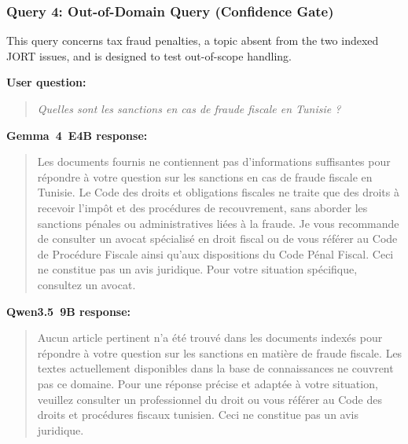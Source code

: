 \subsubsection{Query 4: Out-of-Domain Query (Confidence Gate)}
\label{subsubsec:ch4-query4}

This query concerns tax fraud penalties, a topic absent from the two indexed \ac{JORT} issues, and is designed to test out-of-scope handling.

\vspace{0.5em}

\noindent\textbf{User question:}

\begin{quote}
\textit{Quelles sont les sanctions en cas de fraude fiscale en Tunisie ?}
\end{quote}

\vspace{0.5em}

\noindent\textbf{Gemma~4~E4B response:}

\begin{quote}
Les documents fournis ne contiennent pas d'informations suffisantes pour répondre à votre question sur les sanctions en cas de fraude fiscale en Tunisie. Le Code des droits et obligations fiscales ne traite que des droits à recevoir l'impôt et des procédures de recouvrement, sans aborder les sanctions pénales ou administratives liées à la fraude. Je vous recommande de consulter un avocat spécialisé en droit fiscal ou de vous référer au Code de Procédure Fiscale ainsi qu'aux dispositions du Code Pénal Fiscal. Ceci ne constitue pas un avis juridique. Pour votre situation spécifique, consultez un avocat.
\end{quote}

\noindent\textbf{Qwen3.5~9B response:}

\begin{quote}
Aucun article pertinent n'a été trouvé dans les documents indexés pour répondre à votre question sur les sanctions en matière de fraude fiscale. Les textes actuellement disponibles dans la base de connaissances ne couvrent pas ce domaine. Pour une réponse précise et adaptée à votre situation, veuillez consulter un professionnel du droit ou vous référer au Code des droits et procédures fiscaux tunisien. Ceci ne constitue pas un avis juridique.
\end{quote}

